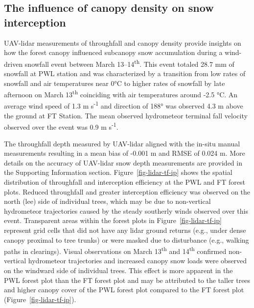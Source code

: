 \documentclass[
  letterpaper,
]{tex/uofsthesis-cs}
\begin{document}
\subsection{The influence of canopy density on snow
interception}\label{the-influence-of-canopy-density-on-snow-interception}

UAV-lidar measurements of throughfall and canopy density provide
insights on how the forest canopy influenced subcanopy snow accumulation
during a wind-driven snowfall event between March
13--14\textsuperscript{th}. This event totaled 28.7 mm of snowfall at
PWL station and was characterized by a transition from low rates of
snowfall and air temperatures near 0°C to higher rates of snowfall by
late afternoon on March 13\textsuperscript{th} coinciding with air
temperatures around -2.5 °C. An average wind speed of 1.3 m
s\textsuperscript{-1} and direction of 188° was observed 4.3 m above the
ground at FT Station. The mean observed hydrometeor terminal fall
velocity observed over the event was 0.9 m s\textsuperscript{-1}.

The throughfall depth measured by UAV-lidar aligned with the in-situ
manual measurements resulting in a mean bias of -0.001 m and RMSE of
0.024 m. More details on the accuracy of UAV-lidar snow depth
measurements are provided in the Supporting Information section.
Figure~\ref{fig-lidar-tf-ip} shows the spatial distribution of
throughfall and interception efficiency at the PWL and FT forest plots.
Reduced throughfall and greater interception efficiency was observed on
the north (lee) side of individual trees, which may be due to
non-vertical hydrometeor trajectories caused by the steady southerly
winds observed over this event. Transparent areas within the forest
plots in Figure~\ref{fig-lidar-tf-ip} represent grid cells that did not
have any lidar ground returns (e.g., under dense canopy proximal to tree
trunks) or were masked due to disturbance (e.g., walking paths in
clearings). Visual observations on March 13\textsuperscript{th} and
14\textsuperscript{th} confirmed non-vertical hydrometeor trajectories
and increased canopy snow loads were observed on the windward side of
individual trees. This effect is more apparent in the PWL forest plot
than the FT forest plot and may be attributed to the taller trees and
higher canopy cover of the PWL forest plot compared to the FT forest
plot (Figure~\ref{fig-lidar-tf-ip}).
\end{document}
